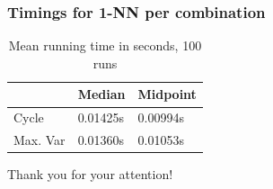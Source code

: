 \documentclass{beamer}
\begin{document}

\begin{frame}
\frametitle{Timings for 1-NN per combination}
\begin{table}[]
	\centering
	\label{my-label}
	\begin{tabular}{l|l|l}
		& Median          & Midpoint        \\ \hline
		Cycle    & 0.01425s & 0.00994s \\ \hline
		Max. Var & 0.01360s & 0.01053s \\ 
	\end{tabular}
	\caption{Mean running time in seconds, 100 runs}
\end{table}
\end{frame}
\begin{frame}
\centering
{\huge Thank you for your attention!}
\end{frame}

%
%

\end{document}
